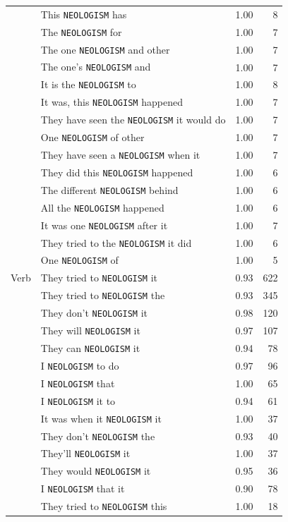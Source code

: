 \begin{table}[t]
\begin{tabular}{llrr}
 & This \texttt{NEOLOGISM} has & 1.00 & 8 \\
 & The \texttt{NEOLOGISM} for & 1.00 & 7 \\
 & The one \texttt{NEOLOGISM} and other & 1.00 & 7 \\
 & The one's \texttt{NEOLOGISM} and & 1.00 & 7 \\
 & It is the \texttt{NEOLOGISM} to & 1.00 & 8 \\
 & It was, this \texttt{NEOLOGISM} happened & 1.00 & 7 \\
 & They have seen the \texttt{NEOLOGISM} it would do & 1.00 & 7 \\
 & One \texttt{NEOLOGISM} of other & 1.00 & 7 \\
 & They have seen a \texttt{NEOLOGISM} when it & 1.00 & 7 \\
 & They did this \texttt{NEOLOGISM} happened & 1.00 & 6 \\
 & The different \texttt{NEOLOGISM} behind & 1.00 & 6 \\
 & All the \texttt{NEOLOGISM} happened & 1.00 & 6 \\
 & It was one \texttt{NEOLOGISM} after it & 1.00 & 7 \\
 & They tried to the \texttt{NEOLOGISM} it did & 1.00 & 6 \\
 & One \texttt{NEOLOGISM} of & 1.00 & 5 \\
\midrule
Verb & They tried to \texttt{NEOLOGISM} it & 0.93 & 622 \\
 & They tried to \texttt{NEOLOGISM} the & 0.93 & 345 \\
 & They don't \texttt{NEOLOGISM} it & 0.98 & 120 \\
 & They will \texttt{NEOLOGISM} it & 0.97 & 107 \\
 & They can \texttt{NEOLOGISM} it & 0.94 & 78 \\
 & I \texttt{NEOLOGISM} to do & 0.97 & 96 \\
 & I \texttt{NEOLOGISM} that & 1.00 & 65 \\
 & I \texttt{NEOLOGISM} it to & 0.94 & 61 \\
 & It was when it \texttt{NEOLOGISM} it & 1.00 & 37 \\
 & They don't \texttt{NEOLOGISM} the & 0.93 & 40 \\
 & They'll \texttt{NEOLOGISM} it & 1.00 & 37 \\
 & They would \texttt{NEOLOGISM} it & 0.95 & 36 \\
 & I \texttt{NEOLOGISM} that it & 0.90 & 78 \\
 & They tried to \texttt{NEOLOGISM} this & 1.00 & 18 \\

\end{tabular}
\end{table}
